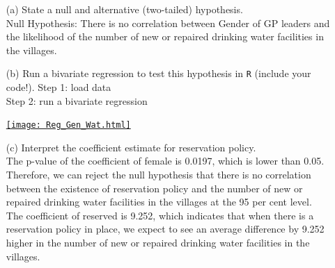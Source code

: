 \documentclass[12pt,letterpaper]{article}
\begin{document}
\newpage
\begin{enumerate}
	\item [(a)] State a null and alternative (two-tailed) hypothesis. \\
	Null Hypothesis: There is no correlation between Gender of GP leaders and the likelihood of the number of new or repaired drinking water facilities in the villages. \\
	\vspace{6cm}
	\item [(b)] Run a bivariate regression to test this hypothesis in \texttt{R} (include your code!).
	Step 1: load data\\
	
	Step 2: run a bivariate regression
		
	\href{file:///C:/Users/Caesar/Documents/GitHub/StatsI_Fall2022/problemSets/PS02/My_Answers/Reg_Gen_Wat.html}{\texttt{[image: Reg\_Gen\_Wat.html]}}
	
	\item [(c)] Interpret the coefficient estimate for reservation policy.\\ 
	The p-value of the coefficient of female is 0.0197, which is lower than 0.05.
	Therefore, we can reject the null hypothesis that there is no correlation between the existence of reservation policy and the number of new or repaired drinking water facilities in the villages at the 95 per cent level.\\ 
	The coefficient of reserved is 9.252, which indicates that when there is a reservation policy in place, we expect to see an average difference by 9.252 higher in the number of new or repaired drinking water facilities in the villages.
\end{enumerate}
\end{document}
